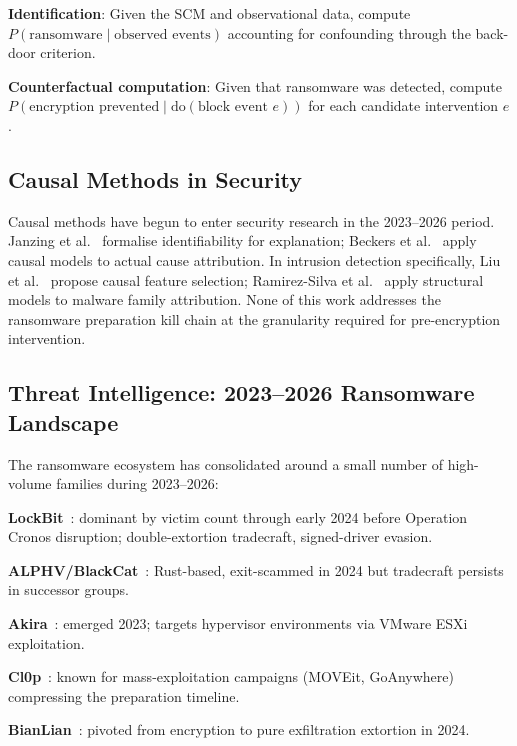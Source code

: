 \documentclass[sigconf,nonacm]{acmart}
\begin{document}
\textbf{Identification}: Given the SCM and observational data, compute
$P(\text{ransomware} \mid \text{observed events})$ accounting for
confounding through the back-door criterion.

\textbf{Counterfactual computation}: Given that ransomware was detected,
compute $P(\text{encryption prevented} \mid \mathrm{do}(\text{block
event } e))$ for each candidate intervention $e$.

\subsection{Causal Methods in Security}

Causal methods have begun to enter security research in the
2023--2026 period. Janzing et al.~\cite{janzing2024causal} formalise
identifiability for explanation; Beckers et
al.~\cite{beckers2024causal} apply causal models to actual cause
attribution. In intrusion detection specifically, Liu et
al.~\cite{liu2024causalids} propose causal feature selection;
Ramirez-Silva et al.~\cite{ramirez2025causalmal} apply structural
models to malware family attribution. None of this work addresses the
ransomware preparation kill chain at the granularity required for
pre-encryption intervention.

\subsection{Threat Intelligence: 2023--2026 Ransomware Landscape}

The ransomware ecosystem has consolidated around a small number of
high-volume families during 2023--2026:

\textbf{LockBit}~\cite{cisa2023lockbit}: dominant by victim count
through early 2024 before Operation Cronos disruption; double-extortion
tradecraft, signed-driver evasion.

\textbf{ALPHV/BlackCat}~\cite{cisa2024alphv}: Rust-based, exit-scammed
in 2024 but tradecraft persists in successor groups.

\textbf{Akira}~\cite{trendmicro2024akira}: emerged 2023; targets
hypervisor environments via VMware ESXi exploitation.

\textbf{Cl0p}~\cite{mandiant2024clop}: known for mass-exploitation
campaigns (MOVEit, GoAnywhere) compressing the preparation timeline.

\textbf{BianLian}~\cite{cisa2024bianlian}: pivoted from encryption to
pure exfiltration extortion in 2024.
\end{document}
